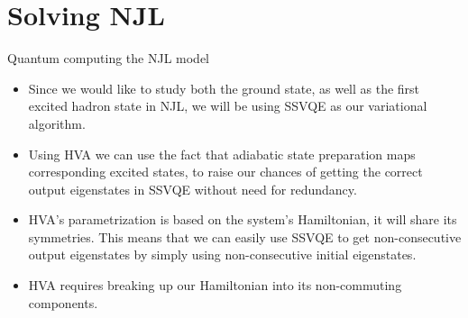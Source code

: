 
\section{Solving NJL}


\begin{frame}[allowframebreaks]{Quantum computing the NJL model}

  \begin{itemize}
    \item<1-> Since we would like to study both the ground state, as well as the first excited hadron state in NJL, we will be using SSVQE as our variational algorithm.
    \item<2-> Using HVA we can use the fact that adiabatic state preparation maps corresponding excited states, to raise our chances of getting the correct output eigenstates in SSVQE without need for redundancy.
    \item<3-> HVA's parametrization is based on the system's Hamiltonian, it will share its symmetries. This means that we can easily use SSVQE to get non-consecutive output eigenstates by simply using non-consecutive initial eigenstates.
    \item<4-> HVA requires breaking up our Hamiltonian into its non-commuting components.
  \end{itemize}


\break


\end{frame}
